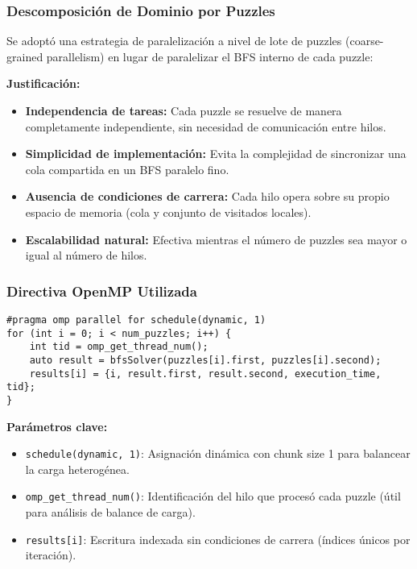 \documentclass[12pt,a4paper]{article}
\begin{document}
\subsubsection{Descomposición de Dominio por Puzzles}

Se adoptó una estrategia de paralelización a nivel de lote de puzzles (coarse-grained parallelism) en lugar de paralelizar el BFS interno de cada puzzle:

\textbf{Justificación:}
\begin{itemize}
    \item \textbf{Independencia de tareas:} Cada puzzle se resuelve de manera completamente independiente, sin necesidad de comunicación entre hilos.
    \item \textbf{Simplicidad de implementación:} Evita la complejidad de sincronizar una cola compartida en un BFS paralelo fino.
    \item \textbf{Ausencia de condiciones de carrera:} Cada hilo opera sobre su propio espacio de memoria (cola y conjunto de visitados locales).
    \item \textbf{Escalabilidad natural:} Efectiva mientras el número de puzzles sea mayor o igual al número de hilos.
\end{itemize}

\subsubsection{Directiva OpenMP Utilizada}

\begin{lstlisting}
#pragma omp parallel for schedule(dynamic, 1)
for (int i = 0; i < num_puzzles; i++) {
    int tid = omp_get_thread_num();
    auto result = bfsSolver(puzzles[i].first, puzzles[i].second);
    results[i] = {i, result.first, result.second, execution_time, tid};
}
\end{lstlisting}

\textbf{Parámetros clave:}
\begin{itemize}
    \item \texttt{schedule(dynamic, 1)}: Asignación dinámica con chunk size 1 para balancear la carga heterogénea.
    \item \texttt{omp\_get\_thread\_num()}: Identificación del hilo que procesó cada puzzle (útil para análisis de balance de carga).
    \item \texttt{results[i]}: Escritura indexada sin condiciones de carrera (índices únicos por iteración).
\end{itemize}
\end{document}
